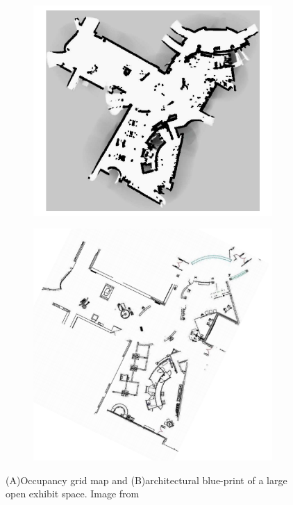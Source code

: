 \begin{figure}
    \begin{subfigure}[b]{0.498\textwidth}
		\centering
		\includegraphics[width=\textwidth, height=0.75\textwidth]{images/occ1.png}
		\label{subfig:a}
		\caption{}
		\vspace{2em}
	\end{subfigure}
	\begin{subfigure}[b]{0.498\textwidth}
	    \centering
		\includegraphics[width=\textwidth, height=0.75\textwidth]{images/occ2.png}
		\label{subfig:b}
		\caption{}
	\end{subfigure}
    \caption{(A)Occupancy grid map and (B)architectural blue-print of a large open exhibit space. Image from \cite{25}}
\end{figure}

